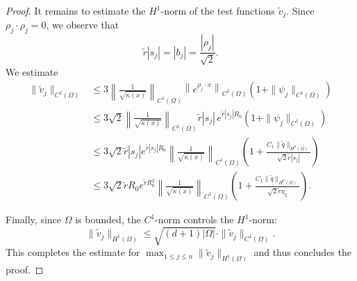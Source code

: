 \documentclass[12pt]{amsart}
\begin{document}
\begin{proof}
It remains to estimate the $H^1$-norm of the test functions $\tilde{v}_j$. Since $\rho_j \cdot \rho_j = 0$, we observe that
\[
\tilde{r} |s_j| = |b_j| = \frac{|\rho_j|}{\sqrt{2}}.
\]
We estimate
\begin{align*}
    \|\tilde{v}_j\|_{C^1(\Omega)} 
    &\leq 3 \left\| \frac{1}{\sqrt{\kappa(x)}} \right\|_{C^1(\Omega)} 
    \left\| e^{\rho_j \cdot x} \right\|_{C^1(\Omega)} 
    \left( 1 + \|\psi_j\|_{C^1(\Omega)} \right) \\
    &\leq 3 \sqrt{2} \left\| \frac{1}{\sqrt{\kappa(x)}} \right\|_{C^1(\Omega)} 
    \tilde{r} |s_j|\, e^{\tilde{r} |s_j| R_0} 
    \left( 1 + \|\psi_j\|_{C^1(\Omega)} \right) \\
    &\leq 3 \sqrt{2} \tilde{r} |s_j| e^{\tilde{r} |s_j| R_0}\left\| \frac{1}{\sqrt{\kappa(x)}} \right\|_{C^1(\Omega)}
    \left( 1 + \frac{C_1 \|\tilde{q}\|_{H^p(\Omega)}}{\sqrt{2} \tilde{r} |s_j|} \right) \\
    &\leq 3 \sqrt{2} \tilde{r} R_0 e^{\tilde{r} R_0^2}\left\| \frac{1}{\sqrt{\kappa(x)}} \right\|_{C^1(\Omega)}
    \left( 1 + \frac{C_1 \|\tilde{q}\|_{H^p(\Omega)}}{\sqrt{2} \tilde{r} \eta_2} \right).
\end{align*}

Finally, since $\Omega$ is bounded, the $C^1$-norm controls the $H^1$-norm:
\[
\|\tilde{v}_j\|_{H^1(\Omega)} \leq \sqrt{(d + 1) |\Omega|} \cdot \|\tilde{v}_j\|_{C^1(\Omega)}.
\]
This completes the estimate for $\max_{1 \leq j \leq n} \|\tilde{v}_j\|_{H^1(\Omega)}$ and thus concludes the proof.
\end{proof}
\end{document}
